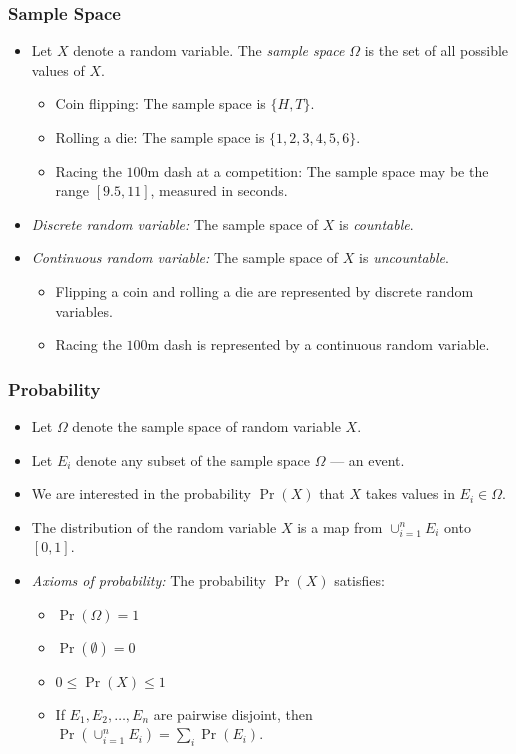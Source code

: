 \begin{frame}
\frametitle{Sample Space} 
\begin{itemize}
\item Let $X$ denote a random variable. The \emph{sample space} $\Omega$ is the set of all possible values of $X$.
\begin{itemize}
\item Coin flipping: The sample space is $\{H,T\}$.
\item Rolling a die: The sample space is $\{1,2,3,4,5,6\}$.
\item Racing the $100$m dash at a competition: The sample space may be the range $[9.5,11]$, measured in seconds.
\end{itemize}
\item \emph{Discrete random variable:} The sample space of $X$ is \emph{countable}. 
\item \emph{Continuous random variable:} The sample space of $X$ is \emph{uncountable}.
\begin{itemize}
\item Flipping a coin and rolling a die are represented by discrete random variables.
\item Racing the $100$m dash is represented by a continuous random variable.
\end{itemize}
\end{itemize}
\end{frame}


\begin{frame}
\frametitle{Probability} 
\begin{itemize}
\item Let $\Omega$ denote the sample space of random variable $X$. 
\item Let $E_{i}$ denote any subset of the sample space $\Omega$ --- an event. 
\item We are interested in the probability $\Pr(X)$ that $X$ takes values in $E_{i} \in \Omega$.
\item The distribution of the random variable $X$ is a map from $\cup_{i=1}^{n}E_i$ onto $[0,1]$.
\item \emph{Axioms of probability:} The probability $\Pr(X)$ satisfies:
\begin{itemize}
\item $\Pr(\Omega) = 1$
\item $\Pr(\emptyset) = 0$
\item $0 \leq \Pr(X) \leq 1$
\item If $E_1,E_2,\dots,E_n$ are pairwise disjoint, then $\Pr(\cup_{i=1}^{n}E_i) = \sum_i\Pr(E_i)$.
\end{itemize}
\end{itemize}
\end{frame}


